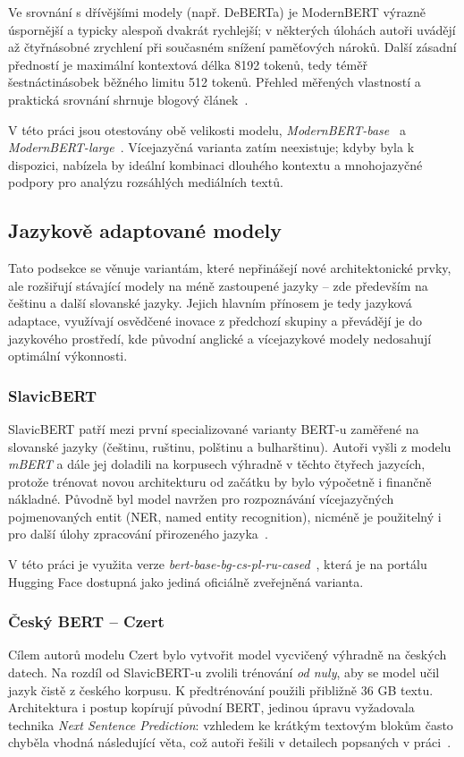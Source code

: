 Ve srovnání s dřívějšími modely (např. DeBERTa) je ModernBERT výrazně úspornější a typicky alespoň dvakrát rychlejší; v některých úlohách autoři uvádějí až čtyřnásobné zrychlení při současném snížení paměťových nároků. Další zásadní předností je maximální kontextová délka 8192 tokenů, tedy téměř šestnáctinásobek běžného limitu 512 tokenů. Přehled měřených vlastností a praktická srovnání shrnuje blogový článek~\cite{modernbertreplacment}.

V této práci jsou otestovány obě velikosti modelu, \emph{ModernBERT-base}~\cite{ModernBERTbase} a \emph{ModernBERT-large}~\cite{ModernBERTlarge}. Vícejazyčná varianta zatím neexistuje; kdyby byla k dispozici, nabízela by ideální kombinaci dlouhého kontextu a mnohojazyčné podpory pro analýzu rozsáhlých mediálních textů.

\subsection{Jazykově adaptované modely}
Tato podsekce se věnuje variantám, které nepřinášejí nové architektonické prvky, ale rozšiřují stávající modely na méně zastoupené jazyky -- zde především na češtinu a další slovanské jazyky. Jejich hlavním přínosem je tedy jazyková adaptace, využívají osvědčené inovace z předchozí skupiny a převádějí je do jazykového prostředí, kde původní anglické a vícejazykové modely nedosahují optimální výkonnosti.

\subsubsection{SlavicBERT}
SlavicBERT patří mezi první specializované varianty BERT-u zaměřené na slovanské jazyky (češtinu, ruštinu, polštinu a bulharštinu). Autoři vyšli z modelu \emph{mBERT} a dále jej doladili na korpusech výhradně v těchto čtyřech jazycích, protože trénovat novou architekturu od začátku by bylo výpočetně i finančně nákladné. Původně byl model navržen pro rozpoznávání vícejazyčných pojmenovaných entit (NER, named entity recognition), nicméně je použitelný i pro další úlohy zpracování přirozeného jazyka~\cite{arkhipov-etal-2019-tuning}.

V této práci je využita verze \emph{bert-base-bg-cs-pl-ru-cased}~\cite{SlavicBERThug}, která je na portálu Hugging Face dostupná jako jediná oficiálně zveřejněná varianta.

\subsubsection{Český BERT -- Czert}\label{Czert}
Cílem autorů modelu Czert bylo vytvořit model vycvičený výhradně na českých datech. Na rozdíl od SlavicBERT-u zvolili trénování \emph{od nuly}, aby se model učil jazyk čistě z českého korpusu. K předtrénování použili přibližně 36 GB textu. Architektura i postup kopírují původní BERT, jedinou úpravu vyžadovala technika \emph{Next Sentence Prediction}: vzhledem ke krátkým textovým blokům často chyběla vhodná následující věta, což autoři řešili v detailech popsaných v práci~\cite{sido2021czertczechbertlike}.

